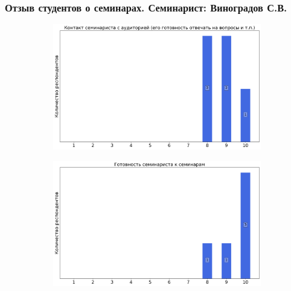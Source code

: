         \subsubsection{Отзыв студентов о семинарах. Семинарист: Виноградов С.В.}
            \begin{figure}[H]
                \centering
                \begin{subfigure}[b]{0.45\textwidth}
                    \centering
                    \includegraphics[width=\textwidth]{images/3 course/Общая физика - квантовая физика/seminarists-marks-Виноградов С.В.-0.png}
                \end{subfigure}
                \begin{subfigure}[b]{0.45\textwidth}
                    \centering
                    \includegraphics[width=\textwidth]{images/3 course/Общая физика - квантовая физика/seminarists-marks-Виноградов С.В.-1.png}
                \end{subfigure}
                \begin{subfigure}[b]{0.45\textwidth}

\end{subfigure}
\end{figure}
